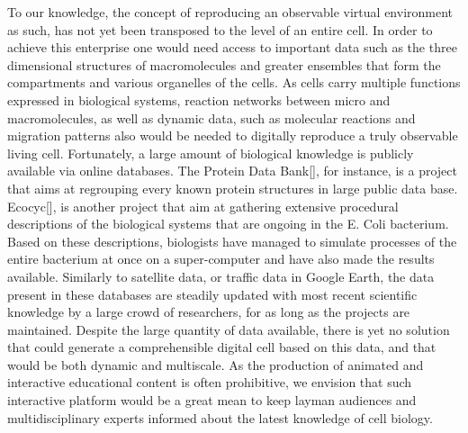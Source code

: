To our knowledge, the concept of reproducing an observable virtual environment as such, has not yet been transposed to the level of an entire cell.
In order to achieve this enterprise one would need access to important data such as the three dimensional structures of macromolecules and greater ensembles that form the compartments and various organelles of the cells.
As cells carry multiple functions expressed in biological systems, reaction networks between micro and macromolecules, as well as dynamic data, such as molecular reactions and migration patterns also would be needed to digitally reproduce a truly observable living cell.
Fortunately, a large amount of biological knowledge is publicly available via online databases.
The Protein Data Bank[], for instance, is a project that aims at regrouping every known protein structures in large public data base.
Ecocyc[], is another project that aim at gathering extensive procedural descriptions of the biological systems that are ongoing in the E. Coli bacterium.
Based on these descriptions, biologists have managed to simulate processes of the entire bacterium at once on a super-computer and have also made the results available.
Similarly to satellite data, or traffic data in Google Earth, the data present in these databases are steadily updated with most recent scientific knowledge by a large crowd of researchers, for as long as the projects are maintained.
Despite the large quantity of data available, there is yet no solution that could generate a comprehensible digital cell based on this data, and that would be both dynamic and multiscale.
As the production of animated and interactive educational content is often prohibitive, we envision that such interactive platform would be a great mean to keep layman audiences and multidisciplinary experts informed about the latest knowledge of cell biology.

%
%
%
%
%
%



